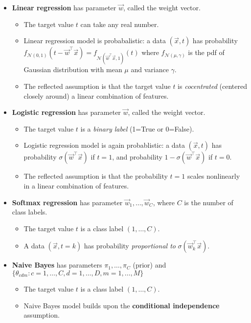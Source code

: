 \documentclass{discussion}
\providecommand{\tightlist}{%
\setlength{\itemsep}{2pt}\setlength{\parskip}{0pt}}
\begin{document}
\begin{itemize}
\tightlist
\item
  \textbf{Linear regression} has parameter \(\vec{w}\), called the
  weight vector.

  \begin{itemize}
  \tightlist
  \item
    The target value \(t\) can take any real number.
  \item
    Linear regression model is probabalistic: a data \((\vec{x}, t)\) has probability
    \(f_{\mathcal{N}(0,1)}(t - \vec{w}^\top\vec{x}) = f_{\mathcal{N}(\vec{w}^\top\vec{x}, 1)}(t)\)
    where \(f_{\mathcal{N(\mu,\gamma)}}\) is the pdf of Gaussian
    distribution with mean \(\mu\) and variance \(\gamma\).
  \item
    The reflected assumption is that the target value \(t\) is
    \emph{cocentrated} (centered closely around) a linear combination of
    features.
  \end{itemize}
\item
  \textbf{Logistic regression} has parameter \(\vec{w}\), called the
  weight vector.

  \begin{itemize}
  \tightlist
  \item
    The target value \(t\) is a \emph{binary label} (1=True or 0=False).
  \item
    Logistic regression model is again probablistic: a data \((\vec{x}, t)\) has
    probability \(\sigma(\vec{w}^\top\vec{x})\) if \(t = 1\), and
    probability \(1 - \sigma(\vec{w}^\top\vec{x})\) if \(t = 0\).
  \item
    The reflected assumption is that the probability \(t = 1\) scales
    nonlinearly in a linear combination of features.
  \end{itemize}
\item
  \textbf{Softmax regression} has parameter
  \(\vec{w}_1, \ldots, \vec{w}_C\), where \(C\) is the number of class
  labels.

  \begin{itemize}
  \tightlist
  \item
    The target value \(t\) is a class label \((1, \ldots, C)\).
  \item
    A data \((\vec{x}, t = k)\) has probability \emph{proportional to}
    \(\sigma(\vec{w}_k^\top\vec{x})\).
  \end{itemize}
\item
  \textbf{Naive Bayes} has parameters \(\pi_1, \ldots, \pi_C\) (prior)
  and
  \(\{\theta_{cdm}: c = 1,\ldots, C, d = 1,\ldots, D, m = 1,\ldots, M\}\)

  \begin{itemize}
  \tightlist
  \item
    The target value \(t\) is a class label \((1, \ldots, C)\).
  \item
    Naive Bayes model builds upon the \textbf{conditional
    independence} assumption.
  \end{itemize}
\end{itemize}
\end{document}
